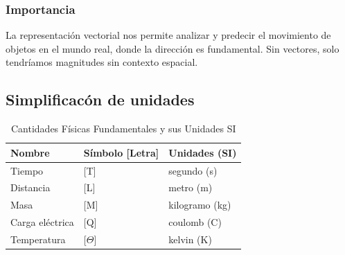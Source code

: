 \documentclass[11pt,a4paper]{article}
\begin{document}

\subsubsection{Importancia}
La representación vectorial nos permite analizar y predecir el movimiento de objetos en el mundo real, donde la dirección es fundamental.  Sin vectores, solo tendríamos magnitudes sin contexto espacial.





\subsection{Simplificacón de unidades}
\begin{table}[h!]
    \centering
    \caption{Cantidades Físicas Fundamentales y sus Unidades SI}
    \begin{tabular}{|l|l|l|}
        \hline
       \textbf{Nombre}           &\textbf{Símbolo}  [Letra] & \textbf{Unidades} (SI) \\ \hline
        Tiempo          & [T]               & segundo (s)   \\ \hline
        Distancia       & [L]               & metro (m)     \\ \hline
        Masa            & [M]               & kilogramo (kg) \\ \hline
        Carga eléctrica & [Q]               & coulomb (C)   \\ \hline
        Temperatura      & [$\Theta$]               & kelvin (K)    \\ \hline
    \end{tabular}
    \label{tab:cantidades_fisicas}
\end{table}
\end{document}
